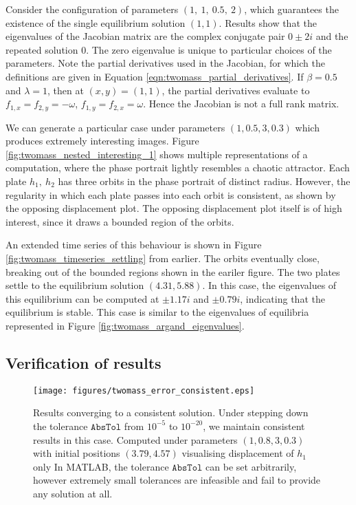 \documentclass{article}
\begin{document}
Consider the configuration of parameters \((1,~1,~0.5,~2)\),
which guarantees the existence of the single equilibrium solution \((1,1)\).
Results show that the eigenvalues of the Jacobian matrix are the complex conjugate pair $ 0 \pm 2i$ and the repeated solution $0$.
The zero eigenvalue is unique to particular choices of the parameters.
Note the partial derivatives used in the Jacobian, for which the definitions are given in Equation \ref{eqn:twomass_partial_derivatives}.
If $\beta = 0.5$ and $\lambda = 1$, then at \((x,y) = (1,1)\),
the partial derivatives evaluate to \(f_{1,x} = f_{2,y} = -\omega\), \(f_{1,y} = f_{2,x} = \omega\).
Hence the Jacobian is not a full rank matrix.




We can generate a particular case under parameters \((1,0.5,3,0.3)\) which produces extremely interesting images.
Figure \ref{fig:twomass_nested_interesting_1} shows multiple representations of a computation,
where the phase portrait lightly resembles a chaotic attractor.
Each plate $h_1,~h_2$ has three orbits in the phase portrait of distinct radius.
However, the regularity in which each plate passes into each orbit is consistent,
as shown by the opposing displacement plot.
The opposing displacement plot itself is of high interest,
since it draws a bounded region of the orbits.

An extended time series of this behaviour is shown in Figure \ref{fig:twomass_timeseries_settling} from earlier.
The orbits eventually close, breaking out of the bounded regions shown in the eariler figure.
The two plates settle to the equilibrium solution \((4.31,5.88)\).
In this case, the eigenvalues of this equilibrium can be computed at $\pm 1.17i$ and $\pm 0.79i$,
indicating that the equilibrium is stable.
This case is similar to the eigenvalues of equilibria represented in Figure \ref{fig:twomass_argand_eigenvalues}.


\subsection{Verification of results}

\begin{figure}
    \centering
    \texttt{[image: figures/twomass\_error\_consistent.eps]}
    \caption{
        Results converging to a consistent solution.
        Under stepping down the tolerance \(\mathtt{AbsTol}\) from $10^{-5}$ to $10^{-20}$,
        we maintain consistent results in this case.
        Computed under parameters \((1, 0.8, 3, 0.3)\) with initial positions \((3.79, 4.57)\) visualising displacement of $h_1$ only
        In MATLAB, the tolerance $\mathtt{AbsTol}$ can be set arbitrarily,
        however extremely small tolerances are infeasible and fail to provide any solution at all.
    }
    \label{twomass_stepping_convergence}
\end{figure}
\end{document}

